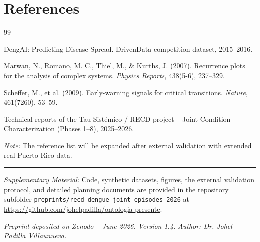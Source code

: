 \documentclass[11pt,a4paper]{article}
\begin{document}
\section*{References}
\begin{thebibliography}{99}

DengAI: Predicting Disease Spread. DrivenData competition dataset, 2015--2016.

Marwan, N., Romano, M. C., Thiel, M., \& Kurths, J. (2007). Recurrence plots for the analysis of complex systems. \textit{Physics Reports}, 438(5-6), 237--329.

Scheffer, M., et al. (2009). Early-warning signals for critical transitions. \textit{Nature}, 461(7260), 53--59.

Technical reports of the Tau Sistémico / RECD project – Joint Condition Characterization (Phases 1--8), 2025--2026.

\end{thebibliography}

\noindent\textit{Note:} The reference list will be expanded after external validation with extended real Puerto Rico data.

\vspace{0.6em}
\hrule
\vspace{0.5em}
\begin{sloppypar}
\noindent\textit{Supplementary Material:} Code, synthetic datasets, figures, the external validation protocol, and detailed planning documents are provided in the repository subfolder \texttt{preprints/recd\_dengue\_joint\_episodes\_2026} at \url{https://github.com/johelpadilla/ontologia-presente}.
\end{sloppypar}

\vspace{0.6em}
\noindent\textit{Preprint deposited on Zenodo – June 2026. Version 1.4.}  
\noindent\textit{Author: Dr. Johel Padilla Villaunueva.}
\end{document}
